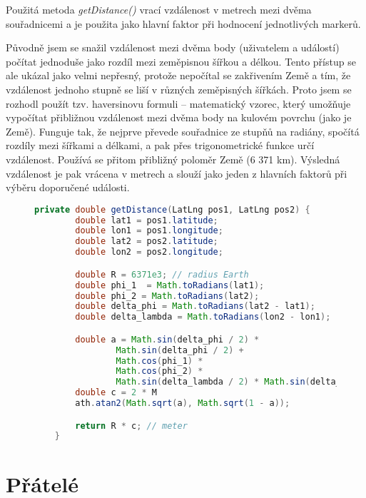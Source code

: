 Použitá metoda \textit{getDistance()} vrací vzdálenost v metrech mezi dvěma souřadnicemi a je použita jako hlavní faktor při hodnocení jednotlivých markerů.

Původně jsem se snažil vzdálenost mezi dvěma body (uživatelem a událostí) počítat jednoduše jako rozdíl mezi zeměpisnou šířkou a délkou. Tento přístup se ale ukázal jako velmi nepřesný, protože nepočítal se zakřivením Země a tím, že vzdálenost jednoho stupně se liší v různých zeměpisných šířkách. Proto jsem se rozhodl použít tzv. haversinovu formuli – matematický vzorec, který umožňuje vypočítat přibližnou vzdálenost mezi dvěma body na kulovém povrchu (jako je Země). Funguje tak, že nejprve převede souřadnice ze stupňů na radiány, spočítá rozdíly mezi šířkami a délkami, a pak přes trigonometrické funkce určí vzdálenost. Používá se přitom přibližný poloměr Země (6 371 km). Výsledná vzdálenost je pak vrácena v metrech a slouží jako jeden z hlavních faktorů při výběru doporučené události.

\begin{figure}[H]
    \centering
    \begin{lstlisting}[language=Java, style=myJavastyle, caption={metoda getDistance() -výpočet vzdálenosti}, label={lst:getDistance}]
    private double getDistance(LatLng pos1, LatLng pos2) {
        double lat1 = pos1.latitude;
        double lon1 = pos1.longitude;
        double lat2 = pos2.latitude;
        double lon2 = pos2.longitude;

        double R = 6371e3; // radius Earth
        double phi_1  = Math.toRadians(lat1);
        double phi_2 = Math.toRadians(lat2);
        double delta_phi = Math.toRadians(lat2 - lat1);
        double delta_lambda = Math.toRadians(lon2 - lon1);

        double a = Math.sin(delta_phi / 2) * 
                Math.sin(delta_phi / 2) +
                Math.cos(phi_1) * 
                Math.cos(phi_2) *
                Math.sin(delta_lambda / 2) * Math.sin(delta_lambda / 2);
        double c = 2 * M
        ath.atan2(Math.sqrt(a), Math.sqrt(1 - a));

        return R * c; // meter
    }
    \end{lstlisting}
\end{figure}
\cite{HaversineFormula}







\section{Přátelé}

